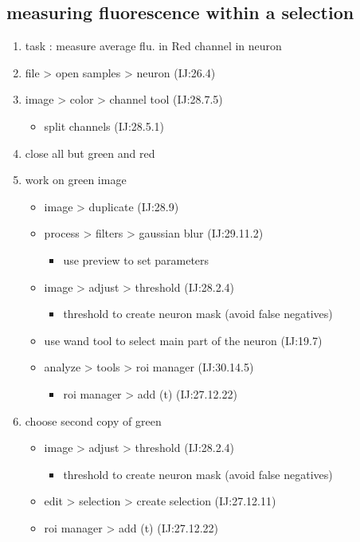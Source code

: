 \documentclass[11pt]{article}
\begin{document}
\subsection{measuring fluorescence within a selection}
\label{sec-5-1}
\begin{enumerate}
\item task : measure average flu. in Red channel in neuron
\item file > open samples > neuron (IJ:26.4)
\item image > color > channel tool (IJ:28.7.5)
\begin{itemize}
\item split channels (IJ:28.5.1)
\end{itemize}
\item close all but green and red
\item work on green image
\begin{itemize}
\item image > duplicate (IJ:28.9)
\item process > filters > gaussian blur (IJ:29.11.2)
\begin{itemize}
\item use preview to set parameters
\end{itemize}
\item image > adjust > threshold (IJ:28.2.4)
\begin{itemize}
\item threshold to create neuron mask (avoid false negatives)
\end{itemize}
\item use wand tool to select main part of the neuron (IJ:19.7)
\item analyze > tools > roi manager (IJ:30.14.5)
\begin{itemize}
\item roi manager > add (t) (IJ:27.12.22)
\end{itemize}
\end{itemize}
\item choose second copy of green
\begin{itemize}
\item image > adjust > threshold (IJ:28.2.4)
\begin{itemize}
\item threshold to create neuron mask (avoid false negatives)
\end{itemize}
\item edit > selection > create selection (IJ:27.12.11)
\item roi manager > add (t) (IJ:27.12.22)

\end{itemize}
\end{enumerate}
\end{document}
